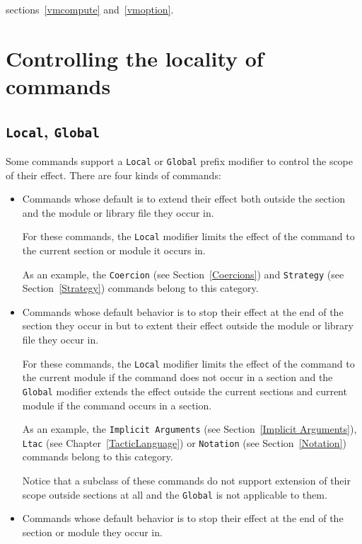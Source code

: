\SeeAlso sections~\ref{vmcompute} and~\ref{vmoption}.

\section{Controlling the locality of commands}

\subsection{{\tt Local}, {\tt Global}
}

Some commands support a {\tt Local} or {\tt Global} prefix modifier to
control the scope of their effect. There are four kinds of commands:

\begin{itemize}
\item Commands whose default is to extend their effect both outside the
  section and the module or library file they occur in.

  For these commands, the {\tt Local} modifier limits the effect of
  the command to the current section or module it occurs in.

  As an example, the {\tt Coercion} (see Section~\ref{Coercions})
  and {\tt Strategy} (see Section~\ref{Strategy})
  commands belong to this category.

\item Commands whose default behavior is to stop their effect at the
  end of the section they occur in but to extent their effect outside
  the module or library file they occur in.

  For these commands, the {\tt Local} modifier limits the effect of
  the command to the current module if the command does not occur in a
  section and the {\tt Global} modifier extends the effect outside the
  current sections and current module if the command occurs in a
  section.

  As an example, the {\tt Implicit Arguments} (see
  Section~\ref{Implicit Arguments}), {\tt Ltac} (see
  Chapter~\ref{TacticLanguage}) or {\tt Notation} (see
  Section~\ref{Notation}) commands belong to this category.

  Notice that a subclass of these commands do not support extension of
  their scope outside sections at all and the {\tt Global} is not
  applicable to them.

\item Commands whose default behavior is to stop their effect at the
  end of the section or module they occur in.


\end{itemize}
